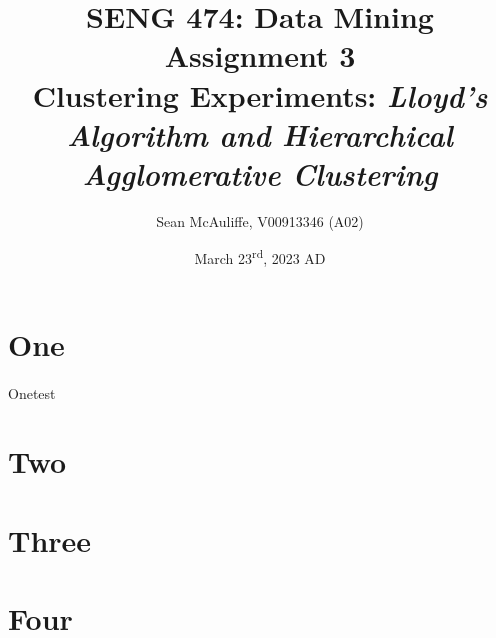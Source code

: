 \documentclass[letterpaper]{article}
\title{\textbf{SENG 474: Data Mining \\Assignment 3} \\[2ex]
\large Clustering Experiments: 
\large \textit{Lloyd's Algorithm and Hierarchical Agglomerative Clustering}}
\author{Sean McAuliffe, V00913346 (A02)}
\date{March 23\textsuperscript{rd}, 2023 AD}
\begin{document}
\maketitle

\pagebreak
\tableofcontents  
\pagebreak

\section{One}

\paragraph{}Onetest

\section{Two}

\section{Three}

\section{Four}
\end{document}
